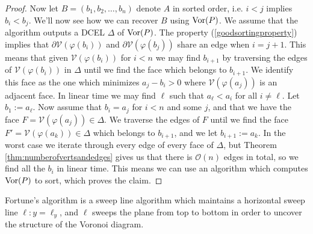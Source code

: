 \begin{proof}
Now let $B = (b_1, b_2, \ldots, b_n)$ denote $A$ in sorted order, i.e. $i < j$ implies $b_i < b_j$. We'll now see how we can recover $B$ using $\operatorname{Vor}(P)$. We assume that the algorithm outputs a DCEL $\Delta$ of $\operatorname{Vor}(P)$. The property (\ref{goodsortingproperty}) implies that $\partial \mathcal{V}(\varphi(b_i))$ and $\partial \mathcal{V}(\varphi(b_j))$ share an edge when $i = j + 1$. This means that given $\mathcal{V}(\varphi(b_i))$ for $i < n$ we may find $b_{i+1}$ by traversing the edges of $\mathcal{V}(\varphi(b_i))$ in $\Delta$ until we find the face which belongs to $b_{i+1}$. We identify this face as the one which minimizes $a_j - b_i > 0$ where $\mathcal{V}(\varphi(a_j))$ is an adjacent face. In linear time we may find $\ell$ such that $a_{\ell} < a_i$ for all $i \ne \ell$. Let $b_1 := a_{\ell}$. Now assume that $b_i = a_j$ for $i < n$ and some $j$, and that we have the face $F = \mathcal{V}(\varphi(a_j)) \in \Delta$. We traverse the edges of $F$ until we find the face $F' = \mathcal{V}(\varphi(a_k)) \in \Delta$ which belongs to $b_{i+1}$, and we let $b_{i+1} := a_k$. In the worst case we iterate through every edge of every face of $\Delta$, but Theorem \ref{thm:numberofvertsandedges} gives us that there is $\mathcal{O}(n)$ edges in total, so we find all the $b_i$ in linear time. This means we can use an algorithm which computes $\operatorname{Vor}(P)$ to sort, which proves the claim.
\end{proof}

Fortune's algorithm is a sweep line algorithm which maintains a horizontal sweep line $\ell \colon y = \ell_y$, and $\ell$ sweeps the plane from top to bottom in order to uncover the structure of the Voronoi diagram. 

